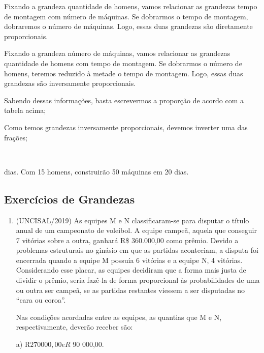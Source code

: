 \begin{multicols*}{2}
Fixando a grandeza quantidade de homens, vamos relacionar as grandezas tempo de montagem com número de máquinas. Se dobrarmos o tempo de montagem, dobraremos o número de máquinas. Logo, essas duas grandezas são diretamente proporcionais.

Fixando a grandeza número de máquinas, vamos relacionar as grandezas quantidade de homens com tempo de montagem. Se dobrarmos o número de homens, teremos reduzido à metade o tempo de montagem. Logo, essas duas grandezas são inversamente proporcionais.

Sabendo dessas informações, basta escrevermos a proporção de acordo com a tabela acima;

Como temos grandezas inversamente proporcionais, devemos inverter uma das frações;

\\



 dias. Com 15 homens, construirão 50 máquinas em 20 dias.

\subsection{Exercícios de Grandezas}

		\begin{enumerate}
		
		\item (UNCISAL/2019) As equipes M e N classificaram-se para disputar o título anual de um campeonato de voleibol. A equipe campeã, aquela que conseguir 7 vitórias sobre a outra, ganhará R\$ 360.000,00 como prêmio. Devido a problemas estruturais no ginásio em que as partidas aconteciam, a disputa foi encerrada quando a equipe M possuía 6 vitórias e a equipe N, 4 vitórias. Considerando esse placar, as equipes decidiram que a forma mais justa de dividir o prêmio, seria fazê-la de forma proporcional às probabilidades de uma ou outra ser campeã, se as partidas restantes viessem a ser disputadas no “cara ou coroa”.
		
Nas condições acordadas entre as equipes, as quantias que M e N, respectivamente, deverão receber são:

a)	  R$ 270 000,00 e R$ 90 000,00.


\end{enumerate}
\end{multicols*}
